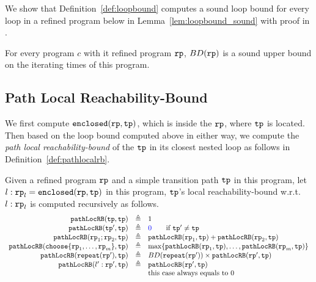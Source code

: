 We show that Definition~\ref{def:loopbound} computes a sound loop bound for every loop in a refined program below in Lemma~\ref{lem:loopbound_sound} with proof in .
\begin{lem}
  \label{lem:loopbound_sound}
  For every program $c$ with it refined program $\mathtt{rp}$,
  $BD(\mathtt{rp})$ is a sound upper bound on the iterating times of this program.
\end{lem}


\subsection{Path Local Reachability-Bound}
We first compute $\mathtt{enclosed}(\mathtt{rp}, \mathtt{tp})$, which is  inside the $\mathtt{rp}$, where $\mathtt{tp}$ is located.
\\
Then based on the loop bound computed above in either way, we compute the \emph{path local reachability-bound} of
the $\mathtt{tp}$ in its closest nested loop as follows in Definition~\ref{def:pathlocalrb}.
\begin{defn}
    \label{def:pathlocalrb}
    Given a refined program $\mathtt{rp}$ and a simple transition path $\mathtt{tp}$ in this program, 
    let $l: \mathtt{rp}_l = \mathtt{enclosed}(\mathtt{rp}, \mathtt{tp})$ in this program,
    $\mathtt{tp}$'s local reachability-bound w.r.t. $l: \mathtt{rp}_l$
    is computed recursively as follows. 
  \[
    \begin{array}{rcl}
      \outinB(\tpath, \tpath) & \triangleq & 1 \\
      \outinB(\tpath', \tpath) & \triangleq & \highlight{0} \qquad \text{if } \tpath' \neq \tpath\\
      \outinB(\rprog_1;\rprog_2, \tpath) & \triangleq & \outinB(\rprog_1, \tpath) + \outinB(\rprog_2, \tpath) \\
      \outinB(\rpchoose{\rprog_1, \ldots, \rprog_m }, \tpath) & \triangleq 
      & \max\left\{ \outinB(\rprog_1, \tpath), \ldots, \outinB(\rprog_m, \tpath) \right\} \\
      \outinB(\rprepeat(\rprog'), \tpath) & \triangleq 
      & BD(\rprepeat(\rprog'))
       \times \outinB(\rprog', \tpath)
       \\
      \outinB(l': \rprog', \tpath) & \triangleq & \outinB(\rprog', \tpath) \\
      &  & \text{this case always equals to } 0 \\
    \end{array}
    \]
\end{defn}
